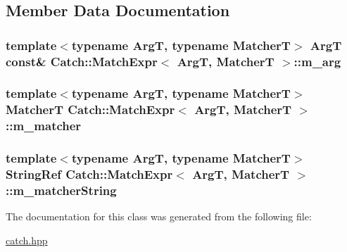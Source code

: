 \subsection{Member Data Documentation}
\hypertarget{class_catch_1_1_match_expr_afb77e2fbf49f956d27f8617a70cf7118}{
\subsubsection[{m\-\_\-arg}]{\setlength{\rightskip}{0pt plus 5cm}template$<$typename Arg\-T, typename Matcher\-T$>$ Arg\-T const\& {\bf Catch\-::\-Match\-Expr}$<$ Arg\-T, Matcher\-T $>$\-::m\-\_\-arg\hspace{0.3cm}{\ttfamily [private]}}}\label{class_catch_1_1_match_expr_afb77e2fbf49f956d27f8617a70cf7118}
\hypertarget{class_catch_1_1_match_expr_a4dea78586dd2b3268b4a186e7c0adbe2}{
\subsubsection[{m\-\_\-matcher}]{\setlength{\rightskip}{0pt plus 5cm}template$<$typename Arg\-T, typename Matcher\-T$>$ Matcher\-T {\bf Catch\-::\-Match\-Expr}$<$ Arg\-T, Matcher\-T $>$\-::m\-\_\-matcher\hspace{0.3cm}{\ttfamily [private]}}}\label{class_catch_1_1_match_expr_a4dea78586dd2b3268b4a186e7c0adbe2}
\hypertarget{class_catch_1_1_match_expr_a33ec706994f744ff1f4a549177ec08f9}{
\subsubsection[{m\-\_\-matcher\-String}]{\setlength{\rightskip}{0pt plus 5cm}template$<$typename Arg\-T, typename Matcher\-T$>$ {\bf String\-Ref} {\bf Catch\-::\-Match\-Expr}$<$ Arg\-T, Matcher\-T $>$\-::m\-\_\-matcher\-String\hspace{0.3cm}{\ttfamily [private]}}}\label{class_catch_1_1_match_expr_a33ec706994f744ff1f4a549177ec08f9}


The documentation for this class was generated from the following file\-:\begin{DoxyCompactItemize}
\item 
\hyperlink{catch_8hpp}{catch.\-hpp}\end{DoxyCompactItemize}

